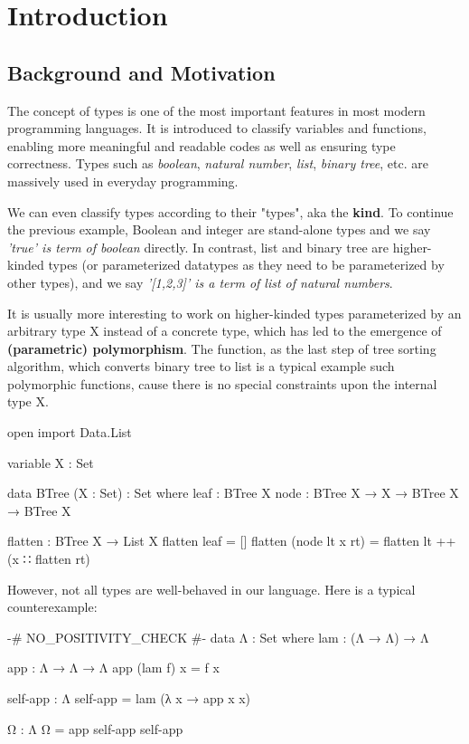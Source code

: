 \chapter{Introduction}

\section{Background and Motivation}

The concept of types is one of the most important features in most modern programming languages. It is introduced to classify variables and functions, enabling more meaningful and readable codes as well as ensuring type correctness. Types such as \textit{boolean}, \textit{natural number}, \textit{list}, \textit{binary tree}, etc. are massively used in everyday programming.

We can even classify types according to their "types", aka the \textbf{kind}. To continue the previous example, Boolean and integer are stand-alone types and we say \textit{'true' is term of boolean} directly. In contrast, list and binary tree are higher-kinded types (or parameterized datatypes as they need to be parameterized by other types), and we say \textit{'[1,2,3]' is a term of list of natural numbers}.

It is usually more interesting to work on higher-kinded types parameterized by an arbitrary type X instead of a concrete type, which has led to the emergence of \textbf{(parametric) polymorphism}. The  function, as the last step of tree sorting algorithm, which converts binary tree to list is a typical example such polymorphic functions, cause there is no special constraints upon the internal type X.

\begin{code}[hide]
open import Data.List

variable X : Set

data BTree (X : Set) : Set where
  leaf : BTree X
  node : BTree X → X → BTree X → BTree X
\end{code}

\begin{code}
flatten : BTree X → List X
flatten leaf = []
flatten (node lt x rt) = flatten lt ++ (x ∷ flatten rt)
\end{code}

However, not all types are well-behaved in our language. Here is a typical counterexample:

\begin{code}
{-# NO_POSITIVITY_CHECK #-}
data Λ : Set where
  lam : (Λ → Λ) → Λ

app : Λ → Λ → Λ
app (lam f) x = f x

self-app : Λ
self-app = lam (λ x → app x x)

Ω : Λ
Ω = app self-app self-app
\end{code}

